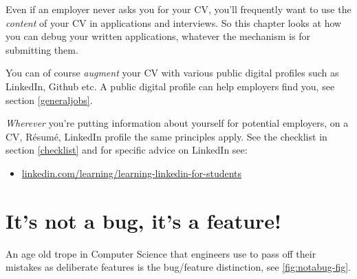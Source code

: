 \documentclass[
]{book}
\providecommand{\tightlist}{%
  \setlength{\itemsep}{0pt}\setlength{\parskip}{0pt}}
\begin{document}
Even if an employer never asks you for your CV, you'll frequently want to use the \emph{content} of your CV in applications and interviews. So this chapter looks at how you can debug your written applications, whatever the mechanism is for submitting them.

You can of course \emph{augment} your CV with various public digital profiles such as LinkedIn, Github etc. A public digital profile can help employers find you, see section \ref{generaljobs}.

\emph{Wherever} you're putting information about yourself for potential employers, on a CV, Résumé, LinkedIn profile the same principles apply. See the checklist in section \ref{checklist} and for specific advice on LinkedIn see:

\begin{itemize}
\tightlist
\item
  \href{https://linkedin.com/learning/learning-linkedin-for-students}{linkedin.com/learning/learning-linkedin-for-students}
\end{itemize}

\hypertarget{trope}{%
\section{It's not a bug, it's a feature!}\label{trope}}

An age old trope in Computer Science that engineers use to pass off their mistakes as deliberate features is the bug/feature distinction, see \ref{fig:notabug-fig}.
\end{document}
